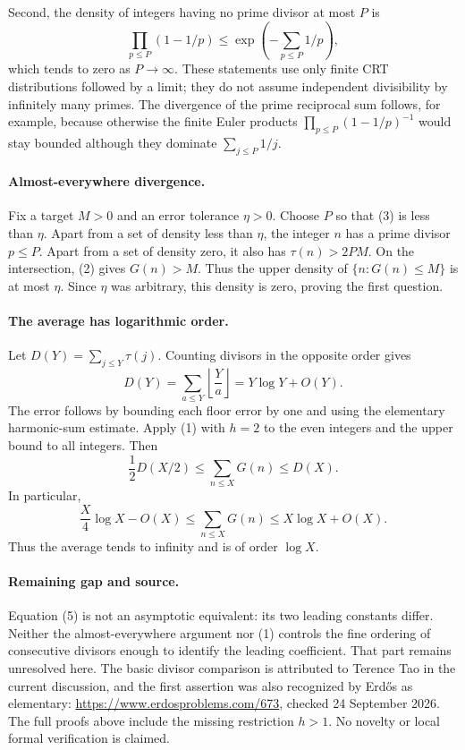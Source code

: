 Second, the density of integers having no prime divisor at most \(P\) is
\[
 \prod_{p\leq P}(1-1/p)\leq\exp\left(-\sum_{p\leq P}1/p\right), \tag{3}
\]
which tends to zero as \(P\to\infty\). These statements use only finite CRT distributions followed by a limit; they do not assume independent divisibility by infinitely many primes. The divergence of the prime reciprocal sum follows, for example, because otherwise the finite Euler products \(\prod_{p\leq P}(1-1/p)^{-1}\) would stay bounded although they dominate \(\sum_{j\leq P}1/j\).

\paragraph{Almost-everywhere divergence.}
Fix a target \(M>0\) and an error tolerance \(\eta>0\). Choose \(P\) so that (3) is less than \(\eta\). Apart from a set of density less than \(\eta\), the integer \(n\) has a prime divisor \(p\leq P\). Apart from a set of density zero, it also has \(\tau(n)>2PM\). On the intersection, (2) gives \(G(n)>M\). Thus the upper density of \(\{n:G(n)\leq M\}\) is at most \(\eta\). Since \(\eta\) was arbitrary, this density is zero, proving the first question.

\paragraph{The average has logarithmic order.}
Let \(D(Y)=\sum_{j\leq Y}\tau(j)\). Counting divisors in the opposite order gives
\[
 D(Y)=\sum_{a\leq Y}\left\lfloor\frac Ya\right\rfloor
 =Y\log Y+O(Y). \tag{4}
\]
The error follows by bounding each floor error by one and using the elementary harmonic-sum estimate. Apply (1) with \(h=2\) to the even integers and the upper bound to all integers. Then
\[
 \frac12D(X/2)\leq\sum_{n\leq X}G(n)\leq D(X).
\]
In particular,
\[
 \frac X4\log X-O(X)
 \leq\sum_{n\leq X}G(n)
 \leq X\log X+O(X). \tag{5}
\]
Thus the average tends to infinity and is of order \(\log X\).

\paragraph{Remaining gap and source.}
Equation (5) is not an asymptotic equivalent: its two leading constants differ. Neither the almost-everywhere argument nor (1) controls the fine ordering of consecutive divisors enough to identify the leading coefficient. That part remains unresolved here. The basic divisor comparison is attributed to Terence Tao in the current discussion, and the first assertion was also recognized by Erd\H{o}s as elementary: \url{https://www.erdosproblems.com/673}, checked 24 September 2026. The full proofs above include the missing restriction \(h>1\). No novelty or local formal verification is claimed.
